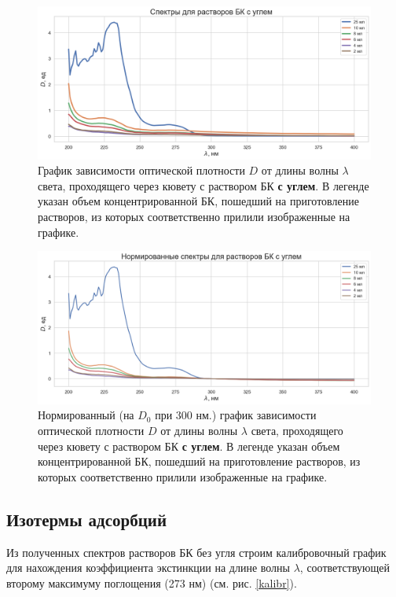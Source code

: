 \documentclass[a4paper,12pt]{article} %
\begin{document}
\begin{figure}[H]
    \includegraphics[width=18cm]{spectr_.png}
    \caption{График зависимости оптической плотности $D$ от длины волны $\lambda$ света, проходящего через кювету с раствором БК \textbf{с углем}. В легенде указан объем концентрированной БК, пошедший на приготовление растворов, из которых соответственно прилили изображенные на графике.}
    \label{spec_}
\end{figure}

\begin{figure}[H]
\centering
    \includegraphics[width=18cm]{specn.png}
    \caption{Нормированный (на $D_0 \text{ при }  300$ нм.) график зависимости оптической плотности $D$ от длины волны $\lambda$ света, проходящего через кювету с раствором БК \textbf{с углем}. В легенде указан объем концентрированной БК, пошедший на приготовление растворов, из которых соответственно прилили изображенные на графике.}
    \label{specn}
\end{figure}

\subsection*{Изотермы адсорбций}
Из полученных спектров растворов БК без угля строим калибровочный график для нахождения коэффициента экстинкции на длине волны $\lambda$, соответствующей второму максимуму поглощения (273 нм) (см. рис. \ref{kalibr}).
\end{document}
